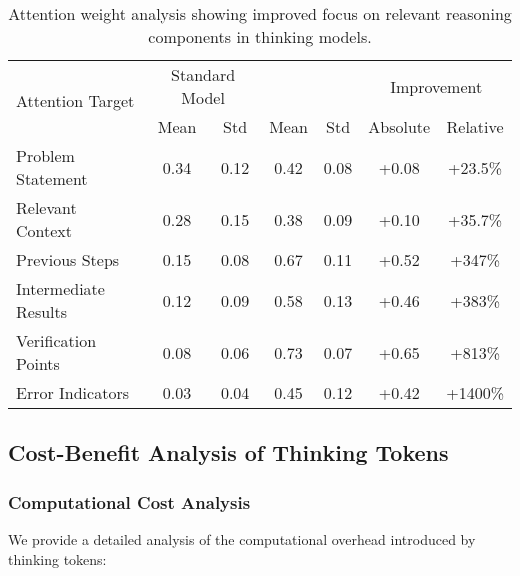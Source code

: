 \begin{table}[H]
\centering
\begin{tabular}{lcccccc}
\toprule
\multirow{2}{*}{Attention Target} & \multicolumn{2}{c}{Standard Model} & \multicolumn{2}{c}{\supra{}} & \multicolumn{2}{c}{Improvement} \\
\cmidrule(lr){2-3} \cmidrule(lr){4-5} \cmidrule(lr){6-7}
& Mean & Std & Mean & Std & Absolute & Relative \\
\midrule
Problem Statement & 0.34 & 0.12 & 0.42 & 0.08 & +0.08 & +23.5\% \\
Relevant Context & 0.28 & 0.15 & 0.38 & 0.09 & +0.10 & +35.7\% \\
Previous Steps & 0.15 & 0.08 & 0.67 & 0.11 & +0.52 & +347\% \\
Intermediate Results & 0.12 & 0.09 & 0.58 & 0.13 & +0.46 & +383\% \\
Verification Points & 0.08 & 0.06 & 0.73 & 0.07 & +0.65 & +813\% \\
Error Indicators & 0.03 & 0.04 & 0.45 & 0.12 & +0.42 & +1400\% \\
\bottomrule
\end{tabular}
\caption{Attention weight analysis showing improved focus on relevant reasoning components in thinking models.}
\label{tab:attention-analysis}
\end{table}

\subsection{Cost-Benefit Analysis of Thinking Tokens}

\subsubsection{Computational Cost Analysis}

We provide a detailed analysis of the computational overhead introduced by thinking tokens:

